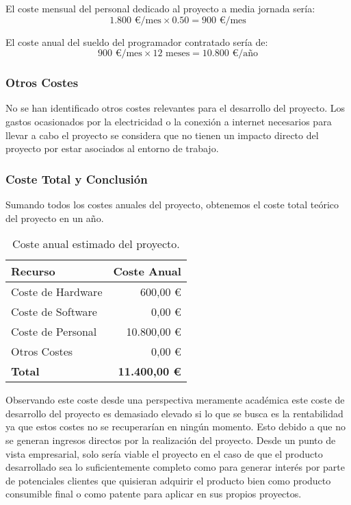 El coste mensual del personal dedicado al proyecto a media jornada sería:
$$ 1.800\text{ €/mes} \times 0.50 = 900\text{ €/mes} $$

El coste anual del sueldo del programador contratado sería de:
$$ 900\text{ €/mes} \times 12\text{ meses} = 10.800\text{ €/año} $$

\subsubsection{Otros Costes}
No se han identificado otros costes relevantes para el desarrollo del proyecto. Los gastos ocasionados por la electricidad o la conexión a internet necesarios para llevar a cabo el proyecto se considera que no tienen un impacto directo del proyecto por estar asociados al entorno de trabajo.

\subsubsection{Coste Total y Conclusión}
Sumando todos los costes anuales del proyecto, obtenemos el coste total teórico del proyecto en un año.

\begin{table}[h!]
\centering
\begin{tabular}{|l|r|}
\hline
\textbf{Recurso} & \textbf{Coste Anual} \\
\hline
Coste de Hardware & 600,00 € \\
Coste de Software & 0,00 € \\
Coste de Personal & 10.800,00 € \\
Otros Costes & 0,00 € \\
\hline
\textbf{Total} & \textbf{11.400,00 €} \\
\hline
\end{tabular}
\caption{Coste anual estimado del proyecto.}
\end{table}

Observando este coste desde una perspectiva meramente académica este coste de desarrollo del proyecto es demasiado elevado si lo que se busca es la rentabilidad ya que estos costes no se recuperarían en ningún momento. Esto debido a que no se generan ingresos directos por la realización del proyecto. Desde un punto de vista empresarial, solo sería viable el proyecto en el caso de que el producto desarrollado sea lo suficientemente completo como para generar interés por parte de potenciales clientes que quisieran adquirir el producto bien como producto consumible final o como patente para aplicar en sus propios proyectos.

